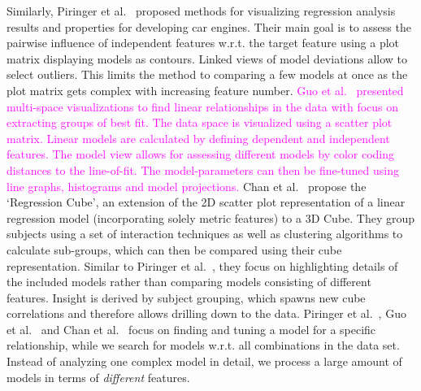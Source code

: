 \documentclass[journal]{style/vgtc} 			          %
\newcommand{\magenta}[1]{\textcolor{magenta}{#1}}
\begin{document}
Similarly, Piringer et al.~\cite{Piringer} proposed methods for visualizing regression analysis results and properties for developing car engines.
Their main goal is to assess the pairwise influence of independent features w.r.t. the target feature using a plot matrix displaying models as contours.
Linked views of model deviations allow to select outliers.
This limits the method to comparing a few models at once as the plot matrix gets complex with increasing feature number.
\magenta{
Guo et al.~\cite{Guo} presented multi-space visualizations to find linear relationships in the data with focus on extracting groups of best fit.
The data space is visualized using a scatter plot matrix.
Linear models are calculated by defining dependent and independent features.
The model view allows for assessing different models by color coding distances to the line-of-fit.
The model-parameters can then be fine-tuned using line graphs, histograms and model projections.
}
Chan et al.~\cite{Chan} propose the `Regression Cube', an extension of the 2D scatter plot representation of a linear regression model (incorporating solely metric features) to a 3D Cube.
They group subjects using a set of interaction techniques as well as clustering algorithms to calculate sub-groups, which can then be compared using their cube representation.
Similar to Piringer et al.~\cite{Piringer}, they focus on highlighting details of the included models rather than comparing models consisting of different features.
Insight is derived by subject grouping, which spawns new cube correlations and therefore allows drilling down to the data.
Piringer et al.~\cite{Piringer}, Guo et al.~\cite{Guo} and Chan et al.~\cite{Chan} focus on finding and tuning a model for a specific relationship, while we search for models w.r.t. all combinations in the data set.
Instead of analyzing one complex model in detail, we process a large amount of models in terms of \emph{different} features.
\end{document}
